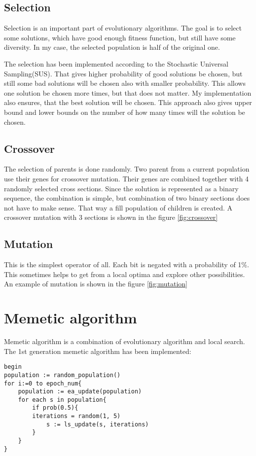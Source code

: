 \documentclass[paper=a4, fontsize=11pt]{scrartcl} %
\numberwithin{equation}{section} %
\numberwithin{figure}{section} %
\numberwithin{table}{section} %
\begin{document}
\subsection{Selection}
Selection is an important part of evolutionary algorithms. The goal is to select some solutions, which have good enough fitness function, but still have some diversity. In my case, the selected population is half of the original one.

	The selection has been implemented according to the Stochastic Universal Sampling(SUS). That gives higher probability of good solutions be chosen, but still some bad solutions will be chosen also with smaller probability. This allows one solution be chosen more times, but that does not matter. My implementation also ensures, that the best solution will be chosen. This approach also gives upper bound and lower bounds on the number of how many times will the solution be chosen.
	
\subsection{Crossover}
The selection of parents is done randomly. Two parent from a current population use their genes for crossover mutation. Their genes are combined together with 4 randomly selected cross sections. Since the solution is represented as a binary sequence, the combination is simple, but combination of two binary sections does not have to make sense. That way a fill population of children is created. A crossover mutation with 3 sections is shown in the figure \ref{fig:crossover}

\subsection{Mutation}
This is the simplest operator of all. Each bit is negated with a probability of 1\%. This sometimes helps to get from a local optima and explore other possibilities. An example of mutation is shown in the figure \ref{fig:mutation}

\section{Memetic algorithm}
Memetic algorithm is a combination of evolutionary algorithm and local search. The 1st generation memetic algorithm has been implemented:

\begin{lstlisting}[frame=single]  % Start your code-block
begin
population := random_population()
for i:=0 to epoch_num{
	population := ea_update(population)
	for each s in population{
		if prob(0.5){
		iterations = random(1, 5)
			s := ls_update(s, iterations)
		}
	}
}
\end{lstlisting}
\end{document}
